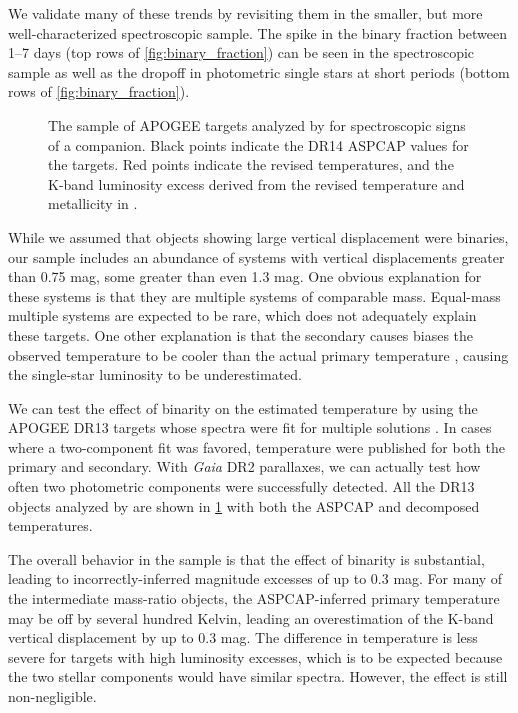 \documentclass[manuscript]{aastex6}
\newcommand{\Gaia}{\mbox{\textit{Gaia}}}
\begin{document}
We validate many of these trends by revisiting them in the smaller, but more
well-characterized spectroscopic sample. The spike in the binary fraction
between 1--7 days (top rows of \cref{fig:binary_fraction}) can be seen in the 
spectroscopic sample as well as the dropoff in photometric single stars at
short periods (bottom rows of \cref{fig:binary_fraction}).

\begin{figure}[htb]
    \centering
    \caption{The sample of APOGEE targets analyzed by \citet{ElBadry18b} for
    spectroscopic signs of a companion. Black points indicate the DR14 ASPCAP
values for the targets. Red points indicate the revised temperatures, and the
K-band luminosity excess derived from the revised temperature and metallicity
in \citet{ElBadry18b}.}
    \label{fig:elbadry_excess}
\end{figure}

While we assumed that objects showing large vertical displacement were
binaries, our sample includes an abundance of systems with vertical
displacements greater than 0.75 mag, some greater than even 1.3 mag. One
obvious explanation for these systems is that they are multiple systems of
comparable mass. Equal-mass multiple systems are expected to be rare, which
does not adequately explain these targets. One other explanation is that the 
secondary causes biases the observed temperature to be cooler than the actual 
primary temperature \citep{Pinsonneault12,ElBadry18a}, causing the single-star 
luminosity to be underestimated. 

We can test the effect of binarity on the estimated temperature by using the
APOGEE DR13 targets whose spectra were fit for multiple solutions
\citep{ElBadry18b}. In cases where a two-component fit was favored, temperature
were published for both the primary and secondary. With \Gaia{} DR2 parallaxes,
we can actually test how often two photometric components were successfully
detected. All the DR13 objects analyzed by \citet{ElBadry18b} are shown in
\cref{fig:elbadry_excess} with both the ASPCAP and decomposed temperatures.

The overall behavior in the \citet{ElBadry18b} sample is that the effect of 
binarity is substantial, leading to incorrectly-inferred magnitude excesses of
up to 0.3 mag. For many of the intermediate mass-ratio objects, the 
ASPCAP-inferred primary temperature may be off by several hundred Kelvin, 
leading an overestimation of the K-band vertical displacement by up to 0.3 
mag. The difference in temperature is less severe for targets with high 
luminosity excesses, which is to be expected because the two stellar 
components would have similar spectra. However, the effect is still 
non-negligible.
\end{document}
